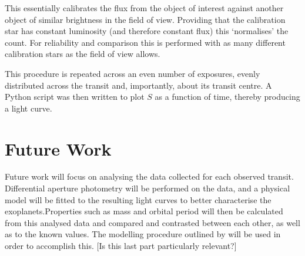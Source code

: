 \documentclass{article}
\begin{document}
This essentially calibrates the flux from the object of interest against another object of similar brightness in the field of view. Providing that the calibration star has constant luminosity (and therefore constant flux) this `normalises' the count. For reliability and comparison this is performed with as many different calibration stars as the field of view allows.

This procedure is repeated across an even number of exposures, evenly distributed across the transit and, importantly, about its transit centre. A Python script was then written to plot $S$ as a function of time, thereby producing a light curve.


\section{Future Work}
Future work will focus on analysing the data collected for each observed transit. Differential aperture photometry will be performed on the data, and a physical model will be fitted to the resulting light curves to better characterise the exoplanets.Properties such as mass and orbital period will then be calculated from this analysed data and compared and contrasted between each other, as well as to the known values. The modelling procedure outlined by \textcite{model} will be used in order to accomplish this. [Is this last part particularly relevant?]


\nocite{*}
\printbibliography

\label{lastpage}
\end{document}
